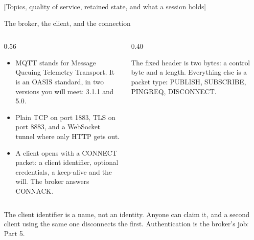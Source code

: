 \documentclass[10pt,aspectratio=169,t]{beamer}
\begin{document}
[Topics, quality of service, retained state, and what a session holds]

\begin{frame}[embedded,eyebrow=MQTT]{The broker, the client, and the connection}
  \vskip 2mm
  \begin{columns}[T]
    \begin{column}{0.56\textwidth}
      \begin{itemize}
        \item MQTT stands for Message Queuing Telemetry Transport. It is an OASIS standard, in two versions you will meet: 3.1.1 and 5.0.
        \item Plain TCP on port 1883, TLS on port 8883, and a WebSocket tunnel where only HTTP gets out.
        \item A client opens with a CONNECT packet: a client identifier, optional credentials, a keep-alive and the will. The broker answers CONNACK.
      \end{itemize}
    \end{column}
    \begin{column}{0.40\textwidth}
      \begin{hint}
        The fixed header is two bytes: a control byte and a length. Everything else is a packet type: PUBLISH, SUBSCRIBE, PINGREQ, DISCONNECT.
      \end{hint}
    \end{column}
  \end{columns}
  \begin{takeaway}{The client identifier is a name, not an identity.}
    Anyone can claim it, and a second client using the same one disconnects the first. Authentication is the broker's job: Part 5.
  \end{takeaway}
\end{frame}
\end{document}
